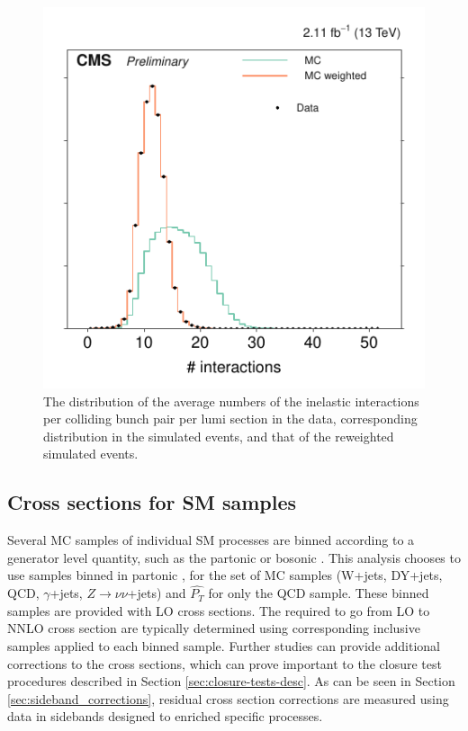 \begin{figure}[!b]
\centering
\includegraphics[scale=1.00]{figures/pileup_reweighting/f044_corr_nTrueInt_data_mc_norm}
\caption{The distribution of the average numbers of the inelastic
interactions per colliding bunch pair per lumi section in the data,
corresponding distribution in the simulated events, and that of the
reweighted simulated events.} \label{f044_corr_nTrueInt_data_mc_norm}
\end{figure}


\subsection{Cross sections for SM samples}
\label{sec:SMxs}
Several MC samples of individual SM processes are binned according to a generator level quantity, such as the partonic \HT or bosonic \PT.
This analysis chooses to use samples binned in partonic \HT, for the set of MC samples (W+jets, DY+jets, QCD, $\gamma$+jets, $Z\rightarrow \nu\nu$+jets) and $\hat{P_{T}}$
for only the QCD sample.
These binned samples are provided with LO cross sections. The \kfactors required to go from LO to NNLO cross section are typically determined using corresponding
inclusive samples applied to each \HT binned sample.
Further studies can provide additional corrections to the cross sections, which can prove important to the closure test procedures described in
Section \ref{sec:closure-tests-desc}. As can be seen in Section \ref{sec:sideband_corrections}, residual cross section
corrections are measured using data in sidebands designed to enriched specific processes.

